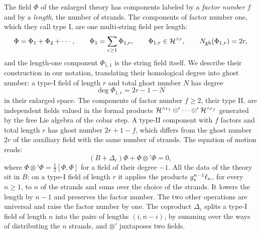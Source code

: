 The field $\Phi$ of the enlarged theory has components labeled by a \emph{factor number} $f$ and by a \emph{length}, the number of strands.
The components of factor number one, which they call type I, are one multi-string field per length:
\begin{equation}
  \label{p:eq:barcobar:type-I}
  \Phi
    = \Phi_1 + \Phi_2 + \cdots,
  \qquad
  \Phi_1
    = \sum_{r \ge 1} \Phi_{1, r},
  \qquad
  \Phi_{1, r}
    \in \mathcal{H}^{\wedge r},
  \qquad
  N_{\text{gh}}(\Phi_{1, r})
    = 2 r,
\end{equation}
and the length-one component $\Phi_{1,1}$ is the string field itself.
We describe their construction in our notation, translating their homological degree into ghost number: a type-I field of length $r$ and total ghost number $N$ has degree
\begin{equation}
  \label{p:eq:barcobar:degree}
  \deg \Phi_{1, r}
    = 2 r - 1 - N
\end{equation}
in their enlarged space.
The components of factor number $f \ge 2$, their type II, are independent fields valued in the formal products $\mathcal{H}^{\wedge r_1} \otimes' \cdots \otimes' \mathcal{H}^{\wedge r_f}$ generated by the free Lie algebra of the cobar step.
A type-II component with $f$ factors and total length $r$ has ghost number $2 r + 1 - f$, which differs from the ghost number $2 r$ of the auxiliary field with the same number of strands.
The equation of motion reads:
\begin{equation}
  \label{p:eq:barcobar:mc}
  (B + \Delta_c) \Phi + \Phi \otimes' \Phi
    = 0,
\end{equation}
where $\Phi \otimes' \Phi = \tfrac{1}{2} [\Phi, \Phi]$ for a field of their degree $-1$.
All the data of the theory sit in $B$: on a type-I field of length $r$ it applies the products $g_s^{n-1} \ell_n$, for every $n \ge 1$, to $n$ of the strands and sums over the choice of the strands.
It lowers the length by $n - 1$ and preserves the factor number.
The two other operations are universal and raise the factor number by one.
The coproduct $\Delta_c$ splits a type-I field of length $n$ into the pairs of lengths $(i, n - i)$, by summing over the ways of distributing the $n$ strands, and $\otimes'$ juxtaposes two fields.

